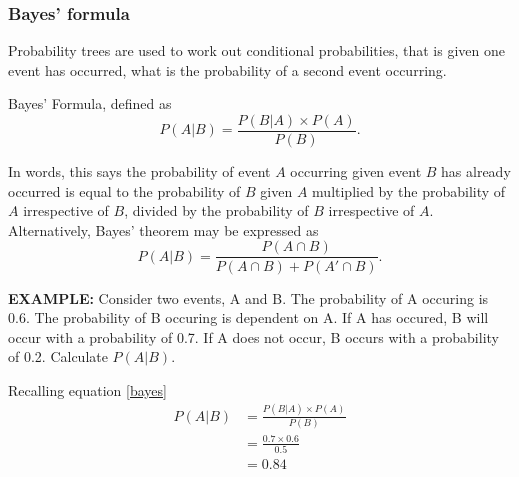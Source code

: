 \documentclass[../notes_compiled.tex]{subfiles}
\begin{document}
\subsubsection{Bayes’ formula}
\begin{itemize}
\item Probability trees are used to work out conditional probabilities, that is given one event has occurred, what is the probability of a second event occurring.
\item Bayes' Formula, defined as 
\begin{equation}
P(A|B) = \frac{P(B|A)\times P(A)}{P(B)}. \label{bayes}
\end{equation}
\item[] In words, this says the probability of event $A$ occurring given event $B$ has already occurred is equal to the probability of $B$ given $A$ multiplied by the probability of $A$ irrespective of $B$, divided by the probability of $B$ irrespective of $A$. Alternatively, Bayes' theorem may be expressed as
\begin{equation}
P(A|B) = \frac{P(A\cap B)}{P(A\cap B)+P(A'\cap B)}.
\end{equation}
{\color{RedViolet}
\item[] \textbf{EXAMPLE:} Consider two events, A and B. The probability of A occuring is 0.6. The probability of B occuring is dependent on A. If A has occured, B will occur with a probability of 0.7. If A does not occur, B occurs with a probability of 0.2. Calculate $P(A|B)$.
}


{\color{RoyalBlue}
Recalling equation \ref{bayes}
\begin{align*}
P(A|B) &= \frac{P(B|A) \times P(A)}{P(B)} \\
&= \frac{0.7\times0.6}{0.5} \\
&=0.84
\end{align*}
}
\end{itemize}
\end{document}
